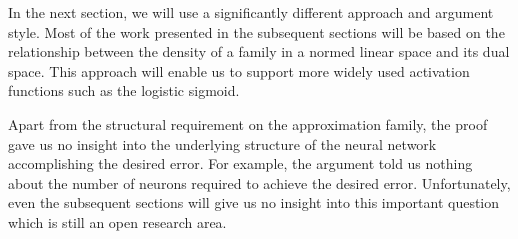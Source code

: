 In the next section, we will use a significantly different approach and argument style. Most of the work presented in the subsequent sections will be based on the relationship between the density of a family in a normed linear space and its dual space. This approach will enable us to support more widely used activation functions such as the logistic sigmoid.

Apart from the structural requirement on the approximation family, the proof gave us no insight into the underlying structure of the neural network accomplishing the desired error. For example, the argument told us nothing about the number of neurons required to achieve the desired error. Unfortunately, even the subsequent sections will give us no insight into this important question which is still an open research area.